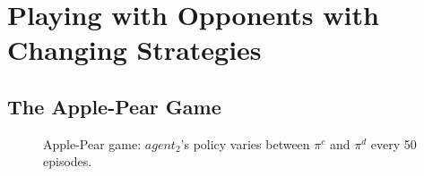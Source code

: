 \documentclass{article}
\begin{document}





\onecolumn
\appendix
\section{Playing with Opponents with Changing Strategies}
\subsection{The Apple-Pear Game}

\begin{figure}[H]
\centering
{}
\caption{Apple-Pear game: $agent_2$'s policy varies between $\pi^c$ and $\pi^d$ every 50 episodes.}
\label{achange}
\end{figure}

\begin{comment}
\begin{figure}[H]
\centering
\subfigure{\texttt{[image: a-change-attitute-60.png]}
\texttt{[image: a-change-agent1-reward-60.png]}
\texttt{[image: a-change-agent2-reward-60.png]}
\texttt{[image: a-change-total-reward-60.png]}
}
\caption{Apple-Pear game: $agent_2$'s policy varies between $\pi^c$ and $\pi^d$ every 60 episodes.}
\label{achange}
\end{figure}

\begin{figure}[H]
\centering
\subfigure{\texttt{[image: a-change-attitute-70.png]}
\texttt{[image: a-change-agent1-reward-70.png]}
\texttt{[image: a-change-agent2-reward-70.png]}
\texttt{[image: a-change-total-reward-70.png]}
}
\caption{Apple-Pear game: $agent_2$'s policy varies between $\pi^c$ and $\pi^d$ every 70 episodes.}
\label{achange}
\end{figure}
\end{comment}
\end{document}
